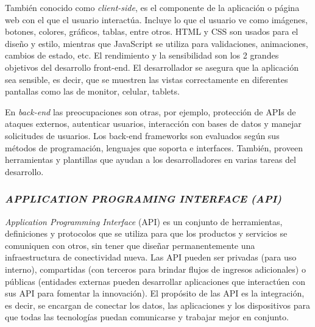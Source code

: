 
También conocido como \textit{client-side}, es el componente de la aplicación o página web con el que el usuario interactúa. Incluye lo que el usuario ve como imágenes, botones, colores, gráficos, tablas, entre otros. HTML y CSS son usados para el diseño y estilo, mientras que JavaScript se utiliza para validaciones, animaciones, cambios de estado, etc. El rendimiento y la sensibilidad son los 2 grandes objetivos del desarrollo front-end. El desarrollador se asegura que la aplicación sea sensible, es decir, que se muestren las vistas correctamente en diferentes pantallas como las de monitor, celular, tablets. \cite{webframedbws}


En \textit{back-end} las preocupaciones son otras, por ejemplo, protección de APIs de ataques externos, autenticar usuarios, interacción con bases de datos y manejar solicitudes de usuarios. Los back-end frameworks son evaluados según sus métodos de programación, lenguajes que soporta e interfaces. También, proveen herramientas y plantillas que ayudan a los desarrolladores en varias tareas del desarrollo. \cite{webframedbws}

\subsubsection{\textit{APPLICATION PROGRAMING INTERFACE (API)}}

\textit{Application Programming Interface} (API) es un conjunto de herramientas, definiciones y protocolos que se utiliza para que los productos y servicios se comuniquen con otros, sin tener que diseñar permanentemente una infraestructura de conectividad nueva. Las API pueden ser privadas (para uso interno), compartidas (con terceros para brindar flujos de ingresos adicionales) o públicas (entidades externas pueden desarrollar aplicaciones que interactúen con sus API para fomentar la innovación).
El propósito de las API es la integración, es decir, se encargan de conectar los datos, las aplicaciones y los dispositivos para que todas las tecnologías puedan comunicarse y trabajar mejor en conjunto.


